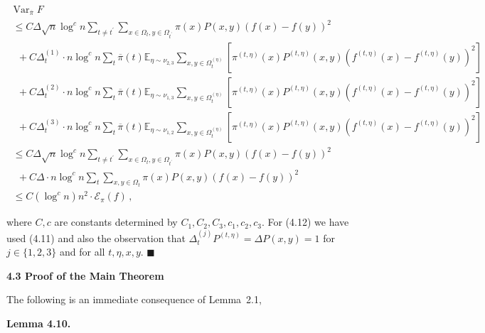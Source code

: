 \documentclass[10pt,a4paper]{article}
\begin{document}
\[\begin{gathered}
\displaystyle\operatorname{Var}_{\overline{\pi}}F \\
\displaystyle~\leq C\Delta\sqrt{n}\log^{c}n\sum_{t\neq t^{\prime}}\sum_{x\in\Omega_{t},y\in\Omega_{t^{\prime}}}\pi(x)P(x,y)(f(x)-f(y))^{2} \\
\displaystyle~~~+C\Delta_{t}^{(1)}\cdot n\log^{c}n\sum_{t}\overline{\pi}(t)\mathbb{E}_{\eta\sim\nu_{2,3}}\sum_{x,y\in\Omega_{t}^{(\eta)}}\left[\pi^{(t,\eta)}(x)P^{(t,\eta)}(x,y)(f^{(t,\eta)}(x)-f^{(t,\eta)}(y))^{2}\right] \\
\displaystyle~~~+C\Delta_{t}^{(2)}\cdot n\log^{c}n\sum_{t}\overline{\pi}(t)\mathbb{E}_{\eta\sim\nu_{1,3}}\sum_{x,y\in\Omega_{t}^{(\eta)}}\left[\pi^{(t,\eta)}(x)P^{(t,\eta)}(x,y)(f^{(t,\eta)}(x)-f^{(t,\eta)}(y))^{2}\right] \\
\displaystyle~~~+C\Delta_{t}^{(3)}\cdot n\log^{c}n\sum_{t}\overline{\pi}(t)\mathbb{E}_{\eta\sim\nu_{1,2}}\sum_{x,y\in\Omega_{t}^{(\eta)}}\left[\pi^{(t,\eta)}(x)P^{(t,\eta)}(x,y)(f^{(t,\eta)}(x)-f^{(t,\eta)}(y))^{2}\right] \\
\displaystyle~\leq C\Delta\sqrt{n}\log^{c}n\sum_{t\neq t^{\prime}}\sum_{x\in\Omega_{t},y\in\Omega_{t^{\prime}}}\pi(x)P(x,y)(f(x)-f(y))^{2} \\
\displaystyle~~~+C\Delta\cdot n\log^{c}n\sum_{t}\sum_{x,y\in\Omega_{t}}\pi(x)P(x,y)(f(x)-f(y))^{2} \\
\displaystyle~\leq C(\log^{c}n)n^{2}\cdot\mathcal{E}_{\pi}(f)\,,
\end{gathered}\]


where $C,c$ are constants determined by $C_{1},C_{2},C_{3},c_{1},c_{2},c_{3}$. For (4.12) we have used (4.11) and also the observation that $\Delta_{t}^{(j)}P^{(t,\eta)}=\Delta P(x,y)=1$ for $j\in\{1,2,3\}$ and for all $t,\eta,x,y$.
\ensuremath{\blacksquare}\par






\par\medskip\noindent\textbf{4.3 Proof of the Main Theorem}\par




The following is an immediate consequence of Lemma 2.1,\par





\par\medskip\noindent\textbf{\textbf{Lemma 4.10}\textbf{.}}\par
\end{document}
